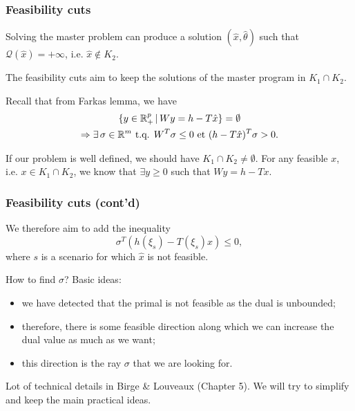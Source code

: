 \documentclass{beamer}
\begin{document}
\begin{frame}
\frametitle{Feasibility cuts}

Solving the master problem can produce a solution $(\hat{x}, \hat{\theta})$ such that $\mathcal{Q}(\hat{x}) = +\infty$, i.e. $\hat{x} \notin K_2$.
	
\mbox{}
	
The {\blue feasibility cuts} aim to keep the solutions of the master program in $K_1 \cap K_2$.
	
\mbox{}
	
\mbox{}

Recall that from Farkas lemma, we have
\begin{multline*}
\lbrace y \in {\mathbb{R}}^p_+ \,|\, Wy = h-T\hat{x} \rbrace = \emptyset \\
\Rightarrow \exists\, \sigma \in {\mathbb{R}}^m \mbox{ t.q. } W^T\sigma \leq 0
\mbox{ et } (h-T\hat{x})^T\sigma > 0.
\end{multline*}

\mbox{}

If our problem is well defined, we should have $K_1 \cap K_2 \ne \emptyset$.
For any feasible $x$, i.e. $x \in K_1 \cap K_2$, we know that $\exists y \geq 0$ such that $Wy = h-Tx$.
	
\end{frame}

\begin{frame}
\frametitle{Feasibility cuts (cont'd)}

We therefore aim to add the inequality
\[
\sigma^T(h(\xi_s)-T(\xi_s)x) \leq 0,
\]
where $s$ is a scenario for which $\hat{x}$ is not feasible.
	
\mbox{}
	
How to find $\sigma$? Basic ideas:
\begin{itemize}
\item
we have detected that the primal is not feasible as the dual is unbounded;
\item
therefore, there is some feasible direction along which we can increase the dual value as much as we want;
\item
this direction is the ray $\sigma$ that we are looking for.
\end{itemize}

\mbox{}

Lot of technical details in Birge \& Louveaux (Chapter 5). We will try to simplify and keep the main practical ideas.
	
\end{frame}
\end{document}
